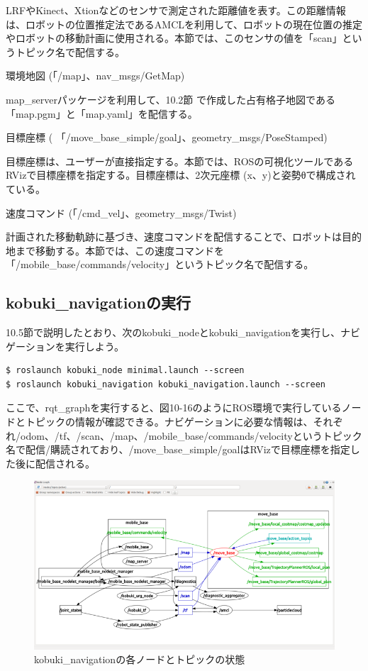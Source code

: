 LRFやKinect、Xtionなどのセンサで測定された距離値を表す。この距離情報は、ロボットの位置推定法であるAMCLを利用して、ロボットの現在位置の推定やロボットの移動計画に使用される。本節では、このセンサの値を「scan」というトピック名で配信する。

\circled{\thenum} 環境地図 (「/map」、nav\_msgs/GetMap)

map\_serverパッケージを利用して、10.2節  で作成した占有格子地図である「map.pgm」と「map.yaml」を配信する。

\circled{\thenum} 目標座標 ( 「/move\_base\_simple/goal」、geometry\_msgs/PoseStamped)

目標座標は、ユーザーが直接指定する。本節では、ROSの可視化ツールであるRVizで目標座標を指定する。目標座標は、2次元座標 (x、y)と姿勢θで構成されている。

\circled{\thenum} 速度コマンド (「/cmd\_vel」、geometry\_msgs/Twist)

計画された移動軌跡に基づき、速度コマンドを配信することで、ロボットは目的地まで移動する。本節では、この速度コマンドを「/mobile\_base/commands/velocity」というトピック名で配信する。

\subsection{kobuki\_navigationの実行}

10.5節で説明したとおり、次のkobuki\_nodeとkobuki\_navigationを実行し、ナビゲーションを実行しよう。

\begin{lstlisting}[language=ROS]
$ roslaunch kobuki_node minimal.launch --screen
$ roslaunch kobuki_navigation kobuki_navigation.launch --screen
\end{lstlisting}

ここで、rqt\_graphを実行すると、図10-16のようにROS環境で実行しているノードとトピックの情報が確認できる。ナビゲーションに必要な情報は、それぞれ/odom、/tf、/scan、/map、/mobile\_base/commands/velocityというトピック名で配信/購読されており、/move\_base\_simple/goalはRVizで目標座標を指定した後に配信される。

\begin{figure}[htp]
  \centering
  \includegraphics[width=\columnwidth]{pictures/chapter10/pic_10_16.png}
  \caption{kobuki\_navigationの各ノードとトピックの状態}
\end{figure}

